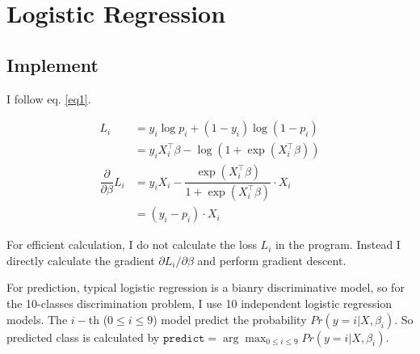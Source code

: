 \documentclass{article}
\begin{document}
\section{Logistic Regression}
\subsection{Implement}
I follow eq. \ref{eq1}.
\begin{spacing}{1.5}
\begin{equation}
    \begin{array}{rl}
        L_i &= y_i\log p_i + (1-y_i)\log (1-p_i)\\
            &= y_iX_i^\top \beta - \log(1+\exp(X_i^\top \beta))\\
        \dfrac{\partial}{\partial\beta}L_i &= 
        y_iX_i - \dfrac{\exp(X_i^\top\beta)}{1+\exp(X_i^\top\beta)}\cdot X_i\\
            &= (y_i - p_i)\cdot X_i
    \end{array}
    \label{eq1}
\end{equation}
\end{spacing}
For efficient calculation, I do not calculate the loss $L_i$ in the program. Instead I directly calculate the gradient $\partial L_i/\partial\beta$ and perform gradient descent.  

For prediction, typical logistic regression is a bianry discriminative model, so for the 10-classes discrimination problem, I use 10 independent logistic regression models. The $i-$th ($0\leq i \leq 9$) model predict the 
probability $Pr(y = i| X, \beta_i)$. So predicted class is calculated by $\mathtt{predict}=\arg\max_{0\leq i\leq 9} Pr(y=i|X, \beta_i)$.
\end{document}
